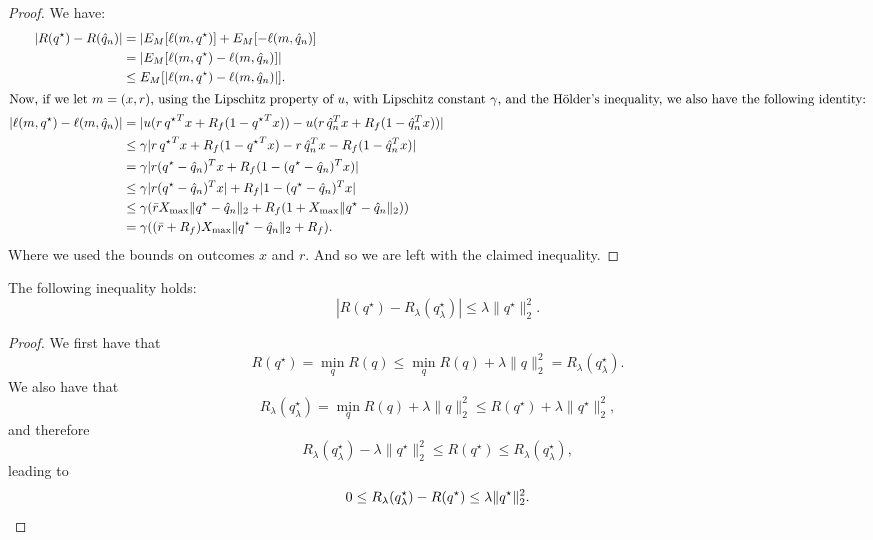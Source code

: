 \begin{proof}
We have:
\begin{align*}
  |R({q^\star}) - R({\hat q}_n)| &= |E_M[\ell(m,{q^\star})] + E_M[-\ell(m,{\hat q}_n)]\\
                                           & = |E_M[\ell(m,{q^\star}) - \ell(m,{\hat q}_n)]|\\
                                           & \leq E_M[|\ell(m,{q^\star}) - \ell(m,{\hat q}_n)|].\\
  \intertext{Now, if we let $m=(x,r)$, using the Lipschitz property of $u$, with Lipschitz constant 
  $\gamma$, and the Hölder's inequality, we also have the following identity:}
  |\ell(m,{q^\star}) - \ell(m,{\hat q}_n)| &= |u(r\,{q^\star}^Tx + R_f(1-{q^\star}^{T}x)) - u(r\,{\hat q}_n^Tx + R_f(1-{\hat q}_n^{T}x))| \\
                                           & \leq \gamma|r\,{q^\star}^Tx + R_f(1-{q^\star}^Tx) - r\,{\hat q}_n^Tx - R_f(1-{\hat q}_n^Tx)|\\
                                           & = \gamma|r({q^\star}-{\hat q}_n)^Tx + R_f(1-({q^\star}-{\hat q}_n)^Tx)|\\
                                           & \leq \gamma|r({q^\star}-{\hat q}_n)^Tx| + R_f|1-({q^\star}-{\hat q}_n)^Tx|\\
                                           & \leq \gamma(\bar rX_{\max} \|{q^\star}-{\hat q}_n\|_2 + R_f(1+X_{\max} \|{q^\star}-{\hat q}_n\|_2))\\
                                           & = \gamma((\bar r + R_f)X_{\max} \|{q^\star} - {\hat q}_n\|_2 + R_f).
\end{align*}
Where we used the bounds on outcomes $x$ and $r$. And so we are left with the claimed
inequality. 
\end{proof}

\begin{claim}
  \label{delage_bound_claim}
  The following inequality holds:
  \begin{equation*}
    |R(q^\star) - R_\lambda(q^\star_\lambda)| \leq \lambda\|q^\star\|^2_2.
  \end{equation*}
\end{claim}
\begin{proof}
  We first have that
  \begin{equation*}
    R(q^\star) = \min_q R(q) \leq \min_q R(q) + \lambda\|q\|_2^2 = R_\lambda(q^\star_\lambda).
  \end{equation*}
  We also have that
  \begin{equation*}
    R_\lambda(q^\star_\lambda) = \min_q R(q) + \lambda\|q\|^2_2 \leq R(q^\star) + \lambda\|q^\star\|^2_2,
  \end{equation*}
  and therefore
  \begin{equation*}
    R_\lambda(q^\star_\lambda) - \lambda\|q^\star\|^2_2 \leq R(q^\star) \leq R_\lambda(q^\star_\lambda),
  \end{equation*}
  leading to
  \begin{equation*}
    0 \leq R_\lambda(q^\star_\lambda) - R(q^\star) \leq \lambda\|q^\star\|^2_2.\qedhere
  \end{equation*}
\end{proof}



